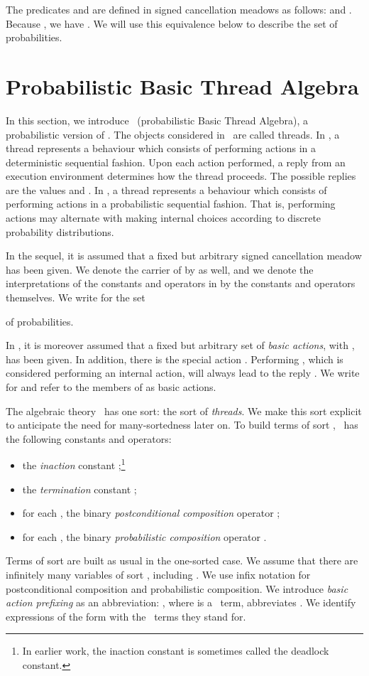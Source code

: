 \documentclass{llncs}
\begin{document}
The predicates  and  are defined in signed cancellation meadows 
as follows: 
 and
.
Because , we have
.
We will use this equivalence below to describe the set of probabilities.

\section{Probabilistic Basic Thread Algebra}
\label{sect-prBTA}

In this section, we introduce \prBTA\ 
(probabilistic Basic Thread Algebra), a probabilistic version of \BTA.
The objects considered in \BTA\ are called threads.
In \BTA, a thread represents a behaviour which consists of performing 
actions in a deterministic sequential fashion.
Upon each action performed, a reply from an execution environment 
determines how the thread proceeds.
The possible replies are the values  and .
In \prBTA, a thread represents a behaviour which consists of performing 
actions in a probabilistic sequential fashion.
That is, performing actions may alternate with making internal choices 
according to discrete probability distributions.

In the sequel, it is assumed that a fixed but arbitrary signed 
cancellation meadow  has been given.
We denote the carrier of  by  as well, and we denote the 
interpretations of the constants and operators in  by the constants 
and operators themselves.
We write  for the set
 
of probabilities.

In \prBTA, it is moreover assumed that a fixed but arbitrary set  
of \emph{basic actions}, with , has been given.
In addition, there is the special action .
Performing , which is considered performing an internal action,
will always lead to the reply .
We write  for  and refer to the 
members of  as basic actions.

The algebraic theory \prBTA\ has one sort: the sort  of 
\emph{threads}. 
We make this sort explicit to anticipate the need for many-sortedness
later on.
To build terms of sort , \prBTA\ has the following constants and 
operators:
\begin{itemize}
\item
the \emph{inaction} constant ;\footnote
{In earlier work, the inaction constant is sometimes called the deadlock
 constant.}
\item
the \emph{termination} constant ;
\item
for each , the binary \emph{postconditional composition} 
operator ;
\item
for each , the binary \emph{probabilistic composition} 
operator .
\end{itemize}
Terms of sort  are built as usual in the one-sorted case. 
We assume that there are infinitely many variables of sort , 
including .
We use infix notation for postconditional composition and probabilistic
composition. 
We introduce \emph{basic action prefixing} as an abbreviation: 
, where  is a \prBTA\ term, abbreviates 
.
We identify expressions of the form  with the \prBTA\
terms they stand for.
\end{document}
